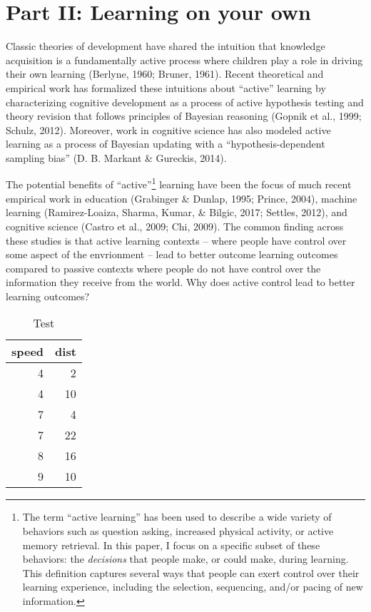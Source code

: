 \documentclass[a4paper,man,apacite,floatsintext]{apa6}
\newenvironment{CodeChunk}{}{}
\begin{document}
\section{Part II: Learning on your
own}\label{part-ii-learning-on-your-own}

Classic theories of development have shared the intuition that knowledge
acquisition is a fundamentally active process where children play a role
in driving their own learning (Berlyne, 1960; Bruner, 1961). Recent
theoretical and empirical work has formalized these intuitions about
``active'' learning by characterizing cognitive development as a process
of active hypothesis testing and theory revision that follows principles
of Bayesian reasoning (Gopnik et al., 1999; Schulz, 2012). Moreover,
work in cognitive science has also modeled active learning as a process
of Bayesian updating with a ``hypothesis-dependent sampling bias'' (D.
B. Markant \& Gureckis, 2014).

The potential benefits of ``active''\footnote{The term ``active
  learning'' has been used to describe a wide variety of behaviors such
  as question asking, increased physical activity, or active memory
  retrieval. In this paper, I focus on a specific subset of these
  behaviors: the \emph{decisions} that people make, or could make,
  during learning. This definition captures several ways that people can
  exert control over their learning experience, including the selection,
  sequencing, and/or pacing of new information.} learning have been the
focus of much recent empirical work in education (Grabinger \& Dunlap,
1995; Prince, 2004), machine learning (Ramirez-Loaiza, Sharma, Kumar, \&
Bilgic, 2017; Settles, 2012), and cognitive science (Castro et al.,
2009; Chi, 2009). The common finding across these studies is that active
learning contexts -- where people have control over some aspect of the
envrionment -- lead to better outcome learning outcomes compared to
passive contexts where people do not have control over the information
they receive from the world. Why does active control lead to better
learning outcomes?

\begin{CodeChunk}
\begin{table}

\caption{\label{tab:unnamed-chunk-1}Test}
\centering
\begin{tabular}[t]{r|r}
\hline
speed & dist\\
\hline
4 & 2\\
\hline
4 & 10\\
\hline
7 & 4\\
\hline
7 & 22\\
\hline
8 & 16\\
\hline
9 & 10\\
\hline
\end{tabular}
\end{table}

\end{CodeChunk}
\end{document}
